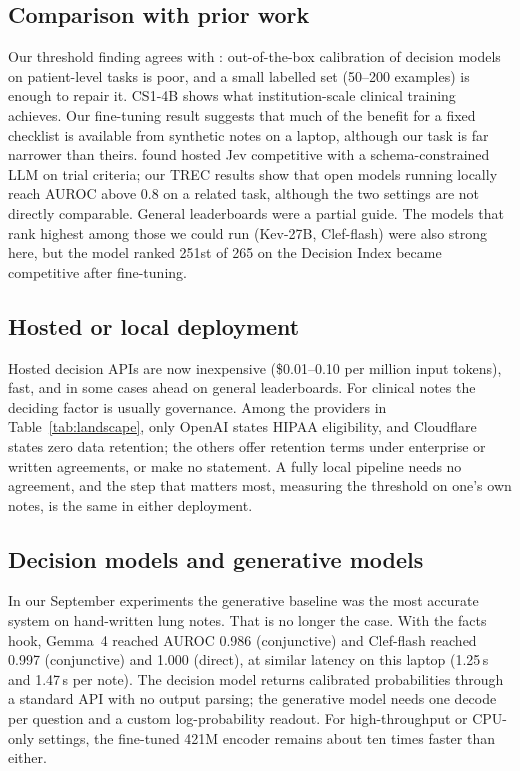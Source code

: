 \documentclass[11pt]{article}
\begin{document}
\subsection{Comparison with prior work}
Our threshold finding agrees with \citet{lee2026medjev}: out-of-the-box calibration of decision models on patient-level tasks is poor, and a small labelled set (50--200 examples) is enough to repair it.
CS1-4B \citep{zhang2026cs1} shows what institution-scale clinical training achieves. Our fine-tuning result suggests that much of the benefit for a fixed checklist is available from synthetic notes on a laptop, although our task is far narrower than theirs.
\citet{he2026trial} found hosted Jev competitive with a schema-constrained LLM on trial criteria; our TREC results show that open models running locally reach AUROC above 0.8 on a related task, although the two settings are not directly comparable.
General leaderboards were a partial guide. The models that rank highest among those we could run (Kev-27B, Clef-flash) were also strong here, but the model ranked 251st of 265 on the Decision Index became competitive after fine-tuning.

\subsection{Hosted or local deployment}
Hosted decision APIs are now inexpensive (\$0.01--0.10 per million input tokens), fast, and in some cases ahead on general leaderboards.
For clinical notes the deciding factor is usually governance.
Among the providers in Table~\ref{tab:landscape}, only OpenAI states HIPAA eligibility, and Cloudflare states zero data retention; the others offer retention terms under enterprise or written agreements, or make no statement.
A fully local pipeline needs no agreement, and the step that matters most, measuring the threshold on one's own notes, is the same in either deployment.

\subsection{Decision models and generative models}
In our September experiments the generative baseline was the most accurate system on hand-written lung notes. That is no longer the case.
With the facts hook, Gemma~4 reached AUROC 0.986 (conjunctive) and Clef-flash reached 0.997 (conjunctive) and 1.000 (direct), at similar latency on this laptop (1.25\,s and 1.47\,s per note).
The decision model returns calibrated probabilities through a standard API with no output parsing; the generative model needs one decode per question and a custom log-probability readout.
For high-throughput or CPU-only settings, the fine-tuned 421M encoder remains about ten times faster than either.
\end{document}
